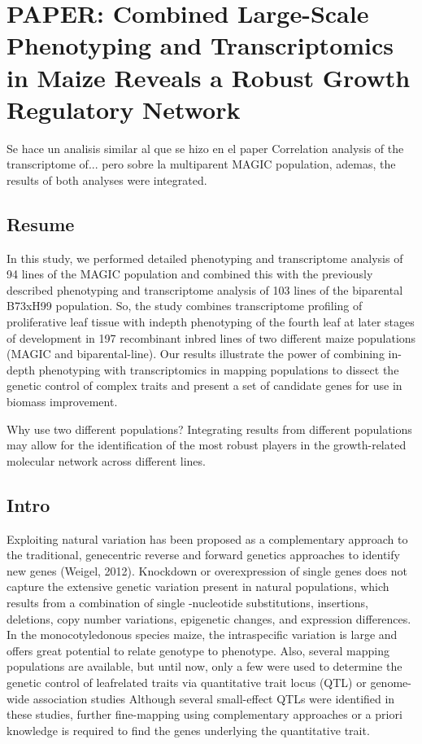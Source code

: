 \documentclass[a4paper,10pt]{article}
\begin{document}
\section{PAPER: Combined Large-Scale Phenotyping and Transcriptomics in Maize Reveals a Robust Growth Regulatory Network}

Se hace un analisis similar al que se hizo en el paper Correlation analysis of the transcriptome of... pero sobre la multiparent MAGIC population, ademas, the results of both analyses were integrated.

\subsection{Resume}
In this study, we performed detailed phenotyping and transcriptome analysis of 94 lines of the MAGIC population and combined this with the previously described phenotyping and transcriptome analysis of 103 lines of
the biparental B73xH99 population. So, the study combines transcriptome profiling of proliferative leaf tissue with indepth phenotyping of the fourth leaf at later stages of development in 197 recombinant inbred lines of two different maize populations (MAGIC and biparental-line).
Our results illustrate the power of combining in-depth phenotyping with transcriptomics in mapping populations to dissect the genetic control of complex traits and present a set of candidate genes for use in biomass improvement.

Why use two different populations? Integrating results from different populations may allow for the identification of the most robust players in the growth-related molecular network across different lines.

\subsection{Intro}
Exploiting natural variation has been proposed as a complementary approach to the traditional, genecentric reverse and forward genetics approaches to identify new genes (Weigel, 2012). 
Knockdown or overexpression of single genes does not capture the extensive genetic variation present in natural populations, which results from a combination of single	-nucleotide substitutions, insertions, deletions, copy number variations, epigenetic changes, and expression differences.
In the monocotyledonous species maize, the intraspecific variation is large and offers great potential to relate genotype to phenotype.
Also, several mapping populations are available, but until now, only a few were used to determine the genetic control of leafrelated traits via quantitative trait locus (QTL) or genome-wide association studies
Although several small-effect QTLs were identified in these studies, further fine-mapping using complementary approaches or a priori knowledge is required to find the genes underlying the quantitative trait.
\end{document}
